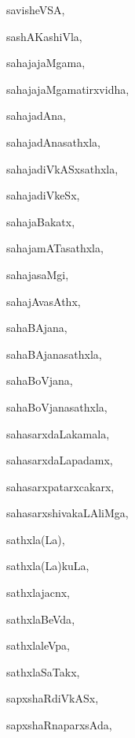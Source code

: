 \begin{multicols}{3}
{\noindent
{savisheVSA}, \pageref{savisheVSA}

\noindent
{sashAKashiVla}, \pageref{sashAKashiVla}

\noindent
{sahajajaMgama}, \pageref{sahajajaMgama}

\noindent
{sahajajaMgamatirxvidha}, \pageref{sahajajaMgamatirxvidha}

\noindent
{sahajadAna}, \pageref{sahajadAna}

\noindent
{sahajadAnasathxla}, \pageref{sahajadAnasathxla}

\noindent
{sahajadiVkASxsathxla}, \pageref{sahajadiVkASxsathxla}

\noindent
{sahajadiVkeSx}, \pageref{sahajadiVkeSx}

\noindent
{sahajaBakatx}, \pageref{sahajaBakatx}

\noindent
{sahajamATasathxla}, \pageref{sahajamATasathxla}

\noindent
{sahajasaMgi}, \pageref{sahajasaMgi}

\noindent
{sahajAvasAthx}, \pageref{sahajAvasAthx}

\noindent
{sahaBAjana}, \pageref{sahaBAjana}

\noindent
{sahaBAjanasathxla}, \pageref{sahaBAjanasathxla}

\noindent
{sahaBoVjana}, \pageref{sahaBoVjana}

\noindent
{sahaBoVjanasathxla}, \pageref{sahaBoVjanasathxla}

\noindent
{sahasarxdaLakamala}, \pageref{sahasarxdaLakamala}

\noindent
{sahasarxdaLapadamx}, \pageref{sahasarxdaLapadamx}

\noindent
{sahasarxpatarxcakarx}, \pageref{sahasarxpatarxcakarx}

\noindent
{sahasarxshivakaLAliMga}, \pageref{sahasarxshivakaLAliMga}

\noindent
{sathxla(La)}, \pageref{sathxlaLa}

\noindent
{sathxla(La)kuLa}, \pageref{sathxlaLakuLa}

\noindent
{sathxlajacnx}, \pageref{sathxlajacnx}

\noindent
{sathxlaBeVda}, \pageref{sathxlaBeVda}

\noindent
{sathxlaleVpa}, \pageref{sathxlaleVpa}

\noindent
{sathxlaSaTakx}, \pageref{sathxlaSaTakx}

\noindent
{sapxshaRdiVkASx}, \pageref{sapxshaRdiVkASx}

\noindent
{sapxshaRnaparxsAda}, \pageref{sapxshaRnaparxsAda}

}
\end{multicols}

